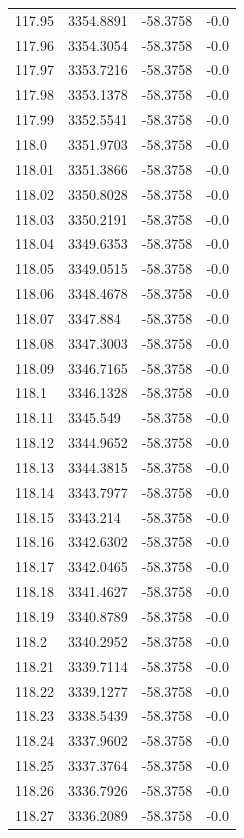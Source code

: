 \begin{table}[H]
\begin{tabular}{llll}
117.95 & 3354.8891 & -58.3758 & -0.0 \\
117.96 & 3354.3054 & -58.3758 & -0.0 \\
117.97 & 3353.7216 & -58.3758 & -0.0 \\
117.98 & 3353.1378 & -58.3758 & -0.0 \\
117.99 & 3352.5541 & -58.3758 & -0.0 \\
118.0 & 3351.9703 & -58.3758 & -0.0 \\
118.01 & 3351.3866 & -58.3758 & -0.0 \\
118.02 & 3350.8028 & -58.3758 & -0.0 \\
118.03 & 3350.2191 & -58.3758 & -0.0 \\
118.04 & 3349.6353 & -58.3758 & -0.0 \\
118.05 & 3349.0515 & -58.3758 & -0.0 \\
118.06 & 3348.4678 & -58.3758 & -0.0 \\
118.07 & 3347.884 & -58.3758 & -0.0 \\
118.08 & 3347.3003 & -58.3758 & -0.0 \\
118.09 & 3346.7165 & -58.3758 & -0.0 \\
118.1 & 3346.1328 & -58.3758 & -0.0 \\
118.11 & 3345.549 & -58.3758 & -0.0 \\
118.12 & 3344.9652 & -58.3758 & -0.0 \\
118.13 & 3344.3815 & -58.3758 & -0.0 \\
118.14 & 3343.7977 & -58.3758 & -0.0 \\
118.15 & 3343.214 & -58.3758 & -0.0 \\
118.16 & 3342.6302 & -58.3758 & -0.0 \\
118.17 & 3342.0465 & -58.3758 & -0.0 \\
118.18 & 3341.4627 & -58.3758 & -0.0 \\
118.19 & 3340.8789 & -58.3758 & -0.0 \\
118.2 & 3340.2952 & -58.3758 & -0.0 \\
118.21 & 3339.7114 & -58.3758 & -0.0 \\
118.22 & 3339.1277 & -58.3758 & -0.0 \\
118.23 & 3338.5439 & -58.3758 & -0.0 \\
118.24 & 3337.9602 & -58.3758 & -0.0 \\
118.25 & 3337.3764 & -58.3758 & -0.0 \\
118.26 & 3336.7926 & -58.3758 & -0.0 \\
118.27 & 3336.2089 & -58.3758 & -0.0 \\

\end{tabular}
\end{table}
